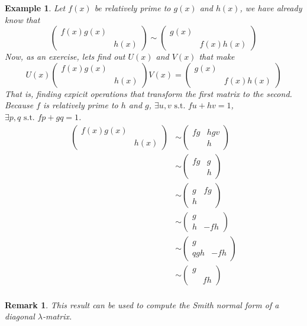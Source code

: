 \documentclass{book}
\newtheorem{example}{Example}[section]
\newtheorem*{remark}{Remark}
\theoremstyle{definition}
\begin{document}
\begin{example}
Let $f(x)$ be relatively prime to $g(x)$ and $h(x)$, we have already know that 
\[\begin{pmatrix}f(x)g(x) & \\&h(x)\end{pmatrix}\sim \begin{pmatrix}
 g(x) & \\&f(x)h(x)\end{pmatrix}\] Now, as an exercise, lets find out $U(x)$ and $V(x)$ that make 
 \[U(x)\begin{pmatrix}f(x)g(x) & \\&h(x)\end{pmatrix}V(x)=\begin{pmatrix}
 g(x) & \\&f(x)h(x)\end{pmatrix}\]
That is, finding expicit operations that transform the first matrix to the second. Because $f$ is relatively prime to $h$ and $g$, $\exists u,v\text{ s.t. }fu+hv=1$,$\exists p,q\text{ s.t. }fp+gq=1$.
\begin{align*}
    \begin{pmatrix}f(x)g(x) & \\&h(x)\end{pmatrix}&\sim \begin{pmatrix}fg& hgv\\&h\end{pmatrix}\\
    &\sim \begin{pmatrix}fg& g\\&h\end{pmatrix}\\
    &\sim \begin{pmatrix}g& fg\\h&\end{pmatrix}\\
    &\sim \begin{pmatrix}g& \\h&-fh\end{pmatrix}\\
    &\sim \begin{pmatrix}g& \\qgh&-fh\end{pmatrix}\\
    &\sim \begin{pmatrix}g& \\&fh\end{pmatrix}\\
\end{align*}
\end{example}
\begin{remark}
This result can be used to compute the Smith normal form of a diagonal $\lambda$-matrix.
\end{remark}
\end{document}
